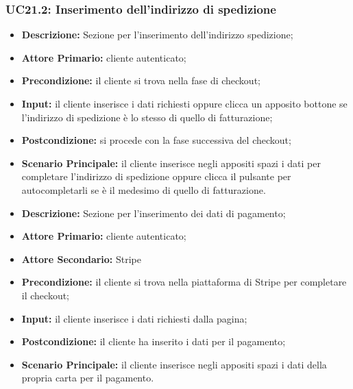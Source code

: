 \subsubsection{UC21.2: Inserimento dell'indirizzo di spedizione}
\label{sec:UC21.2}
\begin{itemize}
    \item \textbf{Descrizione:} Sezione per l'inserimento dell'indirizzo spedizione;
    \item \textbf{Attore Primario:} cliente autenticato;
    \item \textbf{Precondizione:} il cliente si trova nella fase di checkout;
    \item \textbf{Input:} il cliente inserisce i dati richiesti oppure clicca un apposito bottone se l'indirizzo di spedizione è lo stesso di quello di fatturazione;
    \item \textbf{Postcondizione:} si procede con la fase successiva del checkout;
    \item \textbf{Scenario Principale:} il cliente inserisce negli appositi spazi i dati per completare l'indirizzo di spedizione oppure clicca il pulsante per autocompletarli se è il medesimo di quello di fatturazione.
\end{itemize}
\label{sec:UC21.3}
\begin{itemize}
    \item \textbf{Descrizione:} Sezione per l'inserimento dei dati di pagamento;
    \item \textbf{Attore Primario:} cliente autenticato;
    \item \textbf{Attore Secondario:} Stripe
    \item \textbf{Precondizione:} il cliente si trova nella piattaforma di Stripe per completare il checkout;
    \item \textbf{Input:} il cliente inserisce i dati richiesti dalla pagina;
    \item \textbf{Postcondizione:} il cliente ha inserito i dati per il pagamento;
    \item \textbf{Scenario Principale:} il cliente inserisce negli appositi spazi i dati della propria carta per il pagamento.
\end{itemize}